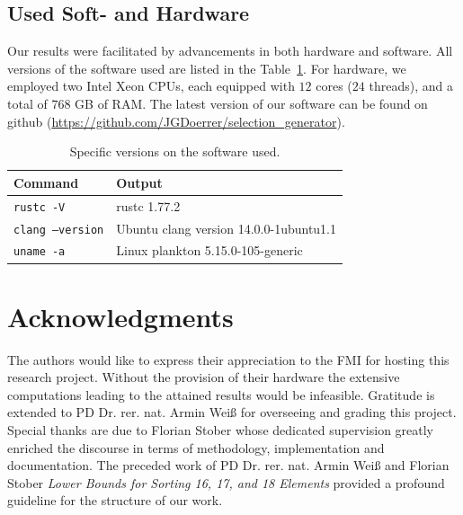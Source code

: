\documentclass[10pt,journal,compsoc]{IEEEtran}
\begin{document}
\subsection{Used Soft- and Hardware} \label{sec:hardware}

Our results were facilitated by advancements in both hardware and software.
All versions of the software used are listed in the Table~\ref{table:command_outputs}.
For hardware, we employed two Intel Xeon CPUs, each equipped with $12$ cores ($24$ threads), and a total of $768$ GB of RAM.
The latest version of our software can be found on github (\url{https://github.com/JGDoerrer/selection_generator}).

\begin{table}[!t]
  \renewcommand{\arraystretch}{1.2}
  \caption{Specific versions on the software used.}
  \label{table:command_outputs}
  \centering
  \begin{tabular}{l|l}
    \textbf{Command}         & \textbf{Output}                        \\ \hline
    \texttt{rustc -V}        & rustc 1.77.2                           \\ \hline
    \texttt{clang --version} & Ubuntu clang version 14.0.0-1ubuntu1.1 \\ \hline
    \texttt{uname -a}        & Linux plankton 5.15.0-105-generic      \\
  \end{tabular}
\end{table}


\section*{Acknowledgments}

The authors would like to express their appreciation to the FMI for hosting this
research project. Without the provision of their hardware the extensive
computations leading to the attained results would be infeasible. Gratitude is
extended to PD Dr. rer. nat. Armin Weiß for overseeing and grading this project. Special thanks
are due to Florian Stober whose dedicated supervision greatly enriched the
discourse in terms of methodology, implementation and documentation. The
preceded work of PD Dr. rer. nat. Armin Weiß and Florian Stober \textit{Lower Bounds for Sorting
  16, 17, and 18 Elements} \cite{stober2022lower} provided a profound guideline
for the structure of our work.

\ifCLASSOPTIONcaptionsoff
  \newpage
\fi




\end{document}
